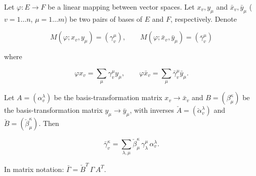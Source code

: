 Let $\varphi: E \to F$ be a linear mapping between vector spaces. Let $x_v, y_\mu$ and $\bar{x}_v, \bar{y}_\mu$ ($v = 1 \ldots n$, $\mu = 1 \ldots m$) be two pairs of bases of $E$ and $F$, respectively. Denote

$$M(\varphi; x_v, y_\mu) = (\gamma_v^\mu), \qquad M(\varphi; \bar{x}_v, \bar{y}_\mu) = (\bar{\gamma}_v^\mu)$$

where

$$\varphi x_v = \sum_\mu \gamma_v^\mu y_\mu, \qquad \varphi \bar{x}_v = \sum_\mu \bar{\gamma}_v^\mu \bar{y}_\mu.$$

Let $A = (\alpha_v^\lambda)$ be the basis-transformation matrix $x_v \to \bar{x}_v$ and $B = (\beta_\mu^\kappa)$ be the basis-transformation matrix $y_\mu \to \bar{y}_\mu$, with inverses $\check{A} = (\check{\alpha}_v^\lambda)$ and $\check{B} = (\check{\beta}_\mu^\kappa)$. Then

$$\bar{\gamma}_v^\kappa = \sum_{\lambda, \mu} \check{\beta}_\mu^\kappa \, \gamma_\lambda^\mu \, \alpha_v^\lambda.$$

In matrix notation: $\bar{\Gamma} = \check{B}^T \, \Gamma \, A^T$.
